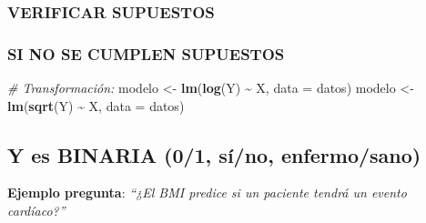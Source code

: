 \documentclass[
  10pt,
]{article}
\newenvironment{Shaded}{\begin{snugshade}}{\end{snugshade}}
\newcommand{\AttributeTok}[1]{\textcolor[rgb]{0.13,0.29,0.53}{#1}}
\newcommand{\CommentTok}[1]{\textcolor[rgb]{0.56,0.35,0.01}{\textit{#1}}}
\newcommand{\DecValTok}[1]{\textcolor[rgb]{0.00,0.00,0.81}{#1}}
\newcommand{\FunctionTok}[1]{\textcolor[rgb]{0.13,0.29,0.53}{\textbf{#1}}}
\newcommand{\NormalTok}[1]{#1}
\newcommand{\OtherTok}[1]{\textcolor[rgb]{0.56,0.35,0.01}{#1}}
\newcommand{\SpecialCharTok}[1]{\textcolor[rgb]{0.81,0.36,0.00}{\textbf{#1}}}
\begin{document}
\subsubsection{VERIFICAR SUPUESTOS}\label{verificar-supuestos}

\begin{Shaded}
\end{Shaded}

\subsubsection{SI NO SE CUMPLEN
SUPUESTOS}\label{si-no-se-cumplen-supuestos}

\begin{Shaded}
\begin{Highlighting}[]
\CommentTok{\# Transformación:}
\NormalTok{modelo }\OtherTok{\textless{}{-}} \FunctionTok{lm}\NormalTok{(}\FunctionTok{log}\NormalTok{(Y) }\SpecialCharTok{\textasciitilde{}}\NormalTok{ X, }\AttributeTok{data =}\NormalTok{ datos)}
\NormalTok{modelo }\OtherTok{\textless{}{-}} \FunctionTok{lm}\NormalTok{(}\FunctionTok{sqrt}\NormalTok{(Y) }\SpecialCharTok{\textasciitilde{}}\NormalTok{ X, }\AttributeTok{data =}\NormalTok{ datos)}
\end{Highlighting}
\end{Shaded}

\subsection{Y es BINARIA (0/1, sí/no,
enfermo/sano)}\label{y-es-binaria-01-suxedno-enfermosano}

\textbf{Ejemplo pregunta}: \emph{``¿El BMI predice si un paciente tendrá
un evento cardíaco?''}
\end{document}
